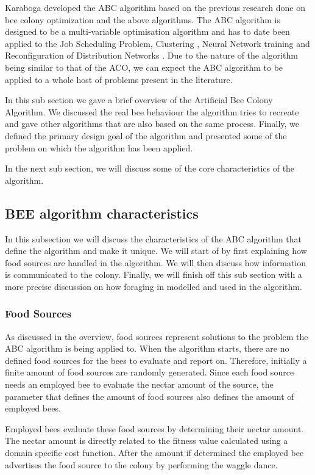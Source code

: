 Karaboga developed the ABC algorithm based on the previous research done on bee colony optimization and the above algorithms. The ABC algorithm is designed to be a multi-variable optimisation algorithm and has to date been applied to the Job Scheduling Problem, Clustering \cite{HybridABCClustering}, Neural Network training and Reconfiguration of Distribution Networks \cite{ABCReconfigDistro}. Due to the nature of the algorithm being similar to that of the ACO, we can expect the ABC algorithm to be applied to a whole host of problems present in the literature.

In this sub section we gave a brief overview of the Artificial Bee Colony Algorithm. We discussed the real bee behaviour the algorithm tries to recreate and  gave other algorithms that are also based on the same process. Finally, we defined the primary design goal of the algorithm and presented some of the problem on which the algorithm has been applied.

In the next sub section, we will discuss some of the core characteristics of the algorithm.
\subsection{BEE algorithm characteristics}
In this subsection we will discuss the characteristics of the ABC algorithm that define the algorithm and make it unique. We will start of by first explaining how food sources are handled in the algorithm. We will then discuss how information is communicated to the colony. Finally, we will finish off this sub section with a more precise discussion on how foraging in modelled and used in the algorithm.
\subsubsection{Food Sources}
As discussed in the overview, food sources represent solutions to the problem the ABC algorithm is being applied to. When the algorithm starts, there are no defined food sources for the bees to evaluate and report on. Therefore, initially a finite amount of food sources are randomly generated. Since each food source needs an employed bee to evaluate the nectar amount of the source, the parameter that defines the amount of food sources also defines the amount of employed bees.

Employed bees evaluate these food sources by determining their nectar amount. The nectar amount is directly related to the fitness value calculated using a domain specific cost function. After the amount if determined the employed bee advertises the food source to the colony by performing the waggle dance. 

